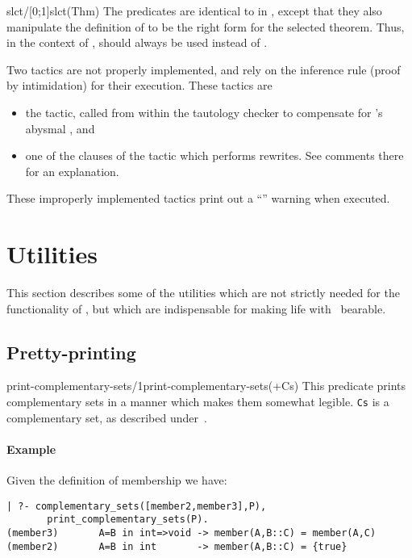 \begin{predicate}{slct/[0;1]}{slct(Thm)}%
The predicates  are identical to  in \oyster,
except that they also manipulate the definition of  to be
the right form for the selected theorem.
Thus, in the context of \clam,  should always be used
instead of .
\end{predicate}

Two tactics are not properly implemented, and rely on the \oyster \notnice
{} inference rule (proof by intimidation) for their
execution. These tactics are
\begin{itemize}
\item
the  tactic, called from within the tautology checker
to compensate for \oyster's abysmal , and
\item
one of the clauses of the  tactic which performs
rewrites. See comments there for an explanation. 
\end{itemize}
These improperly implemented tactics print out a ``'' warning when executed.

\section {Utilities}
\label{user-utils}

This section describes some of the utilities which are not strictly
needed for the functionality of \clam, but which are indispensable for
making life with \clam\ bearable.




\subsection {Pretty-printing}
\label{pretty-printer}

\begin{predicate}{print-complementary-sets/1}{print-complementary-sets(+Cs)}%
This predicate prints complementary sets in a manner which makes
them somewhat legible.    \verb|Cs| is a complementary set, as
described under~.

\paragraph {Example} Given the definition of membership we have:

\begin{verbatim}
| ?- complementary_sets([member2,member3],P),
       print_complementary_sets(P).
(member3)       A=B in int=>void -> member(A,B::C) = member(A,C)
(member2)       A=B in int       -> member(A,B::C) = {true}
\end{verbatim}

\end{predicate}


